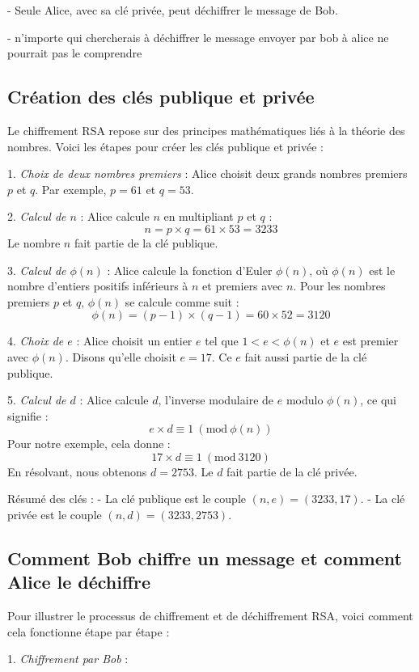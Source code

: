 \documentclass[a4paper,12pt]{article}
\begin{document}
- Seule Alice, avec sa clé privée, peut déchiffrer le message de Bob.

- n'importe qui chercherais à déchiffrer le message envoyer par bob à alice ne pourrait pas le comprendre 

\subsection{Création des clés publique et privée}
Le chiffrement RSA repose sur des principes mathématiques liés à la théorie des nombres. Voici les étapes pour créer les clés publique et privée :

1. \textit{Choix de deux nombres premiers} : Alice choisit deux grands nombres premiers \(p\) et \(q\). Par exemple, \(p = 61\) et \(q = 53\).

2. \textit{Calcul de \(n\)} : Alice calcule \(n\) en multipliant \(p\) et \(q\) :
\[ n = p \times q = 61 \times 53 = 3233 \]
Le nombre \(n\) fait partie de la clé publique.

3. \textit{Calcul de \(\phi(n)\)} : Alice calcule la fonction d'Euler \(\phi(n)\), où \(\phi(n)\) est le nombre d'entiers positifs inférieurs à \(n\) et premiers avec \(n\). Pour les nombres premiers \(p\) et \(q\), \(\phi(n)\) se calcule comme suit :
\[ \phi(n) = (p-1) \times (q-1) = 60 \times 52 = 3120 \]

4. \textit{Choix de \(e\)} : Alice choisit un entier \(e\) tel que \(1 < e < \phi(n)\) et \(e\) est premier avec \(\phi(n)\). Disons qu'elle choisit \(e = 17\). Ce \(e\) fait aussi partie de la clé publique.

5. \textit{Calcul de \(d\)} : Alice calcule \(d\), l'inverse modulaire de \(e\) modulo \(\phi(n)\), ce qui signifie :
\[ e \times d \equiv 1 \ (\text{mod} \ \phi(n)) \]
Pour notre exemple, cela donne :
\[ 17 \times d \equiv 1 \ (\text{mod} \ 3120) \]
En résolvant, nous obtenons \(d = 2753\). Le \(d\) fait partie de la clé privée.

Résumé des clés :
- La clé publique est le couple \((n, e) = (3233, 17)\).
- La clé privée est le couple \((n, d) = (3233, 2753)\).

\subsection{Comment Bob chiffre un message et comment Alice le déchiffre}
Pour illustrer le processus de chiffrement et de déchiffrement RSA, voici comment cela fonctionne étape par étape :

1. \textit{Chiffrement par Bob} :
   
\end{document}
